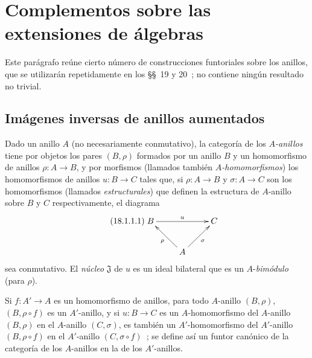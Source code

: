 \section{Complementos sobre las extensiones de álgebras}
\label{section:0.18-fr}

Este parágrafo reúne cierto número de construcciones funtoriales sobre
los anillos, que se utilizarán repetidamente en los \S\S~19 y 20~; no
contiene ningún resultado no trivial.

\subsection{Imágenes inversas de anillos aumentados}
\label{subsection:0.18.1-fr}

\begin{env}[18.1.1]
\label{0.18.1.1-fr}
Dado un anillo $A$ (no necesariamente conmutativo), la categoría de los
\emph{$A$-anillos} tiene por objetos los pares $(B,\rho)$ formados por un anillo
$B$ y un homomorfismo de anillos $\rho:A\to B$, y por morfismos (llamados también
\emph{$A$-homomorfismos}) los homomorfismos de anillos $u:B\to C$ tales que,
si $\rho:A\to B$ y $\sigma:A\to C$ son los homomorfismos (llamados
\emph{estructurales}) que definen la estructura de $A$-anillo sobre $B$ y $C$
respectivamente, el diagrama
\begin{equation}
\label{0.18.1.1.1-fr}
\tag{18.1.1.1}
  \xymatrix{
    B\ar[rr]^u & & C\\
    & A\ar[lu]^\rho\ar[ru]_\sigma
  }
\end{equation}
sea conmutativo. El \emph{núcleo} $\mathfrak{J}$ de $u$ es un ideal bilateral
que es un $A$-\emph{bimódulo} (para $\rho$).

Si $f:A'\to A$ es un homomorfismo de anillos, para todo $A$-anillo
$(B,\rho)$, $(B,\rho\circ f)$ es un $A'$-anillo, y si $u:B\to C$ es un
$A$-homomorfismo del $A$-anillo $(B,\rho)$
en el $A$-anillo $(C,\sigma)$, es también un $A'$-homomorfismo del
$A'$-anillo $(B,\rho\circ f)$ en el $A'$-anillo $(C,\sigma\circ f)$~; se
define así un funtor canónico de la categoría de los $A$-anillos en la de
los $A'$-anillos.
\end{env}

